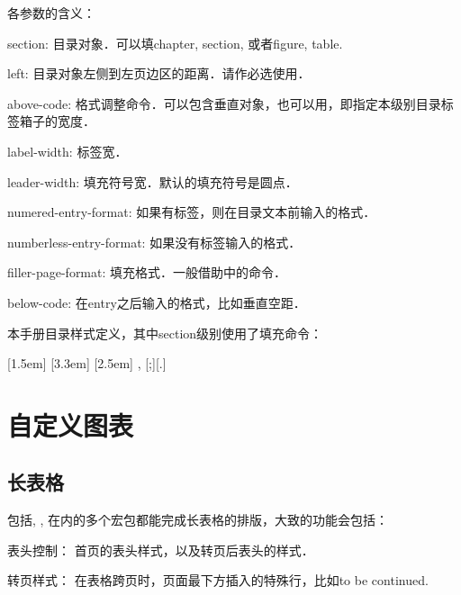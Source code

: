 各参数的含义：
\begin{para}
\item[section:] 目录对象．可以填chapter, section, 或者figure, table.
\item[left:] 目录对象左侧到左页边区的距离．请作必选使用．
\item[above-code:] 格式调整命令．可以包含垂直对象，也可以用，即指定本级别目录标签箱子的宽度．
\item[label-width:] 标签宽．
\item[leader-width:] 填充符号宽．默认的填充符号是圆点．
\item[numered-entry-format:] 如果有标签，则在目录文本前输入的格式．
\item[numberless-entry-format:] 如果没有标签输入的格式．
\item[filler-page-format:] 填充格式．一般借助中的命令．
\item[below-code:] 在entry之后输入的格式，比如垂直空距．
\end{para}

本手册目录样式定义，其中section级别使用了填充命令：
\begin{latex}
[1.5em]{}{\contentslabel{1.5em}}
    {\hspace*{-2em}}{\hfill\contentspage}
[3.3em]{}
    {\contentslabel{1.8em}}{\hspace*{-2.3em}}
    {\titlerule*[8pt]{$\cdot$}\contentspage}
[2.5em]{\small}
    {\thecontentslabel{}}{}
    {, \thecontentspage}[;\qquad][.]
\end{latex}

\section{自定义图表}
\label{sec:figtab}
\subsection{长表格}
包括, , 在内的多个宏包都能完成长表格的排版，大致的功能会包括：
\begin{para}
\item[表头控制：] 首页的表头样式，以及转页后表头的样式．
\item[转页样式：] 在表格跨页时，页面最下方插入的特殊行，比如to be continued.
\end{para}

